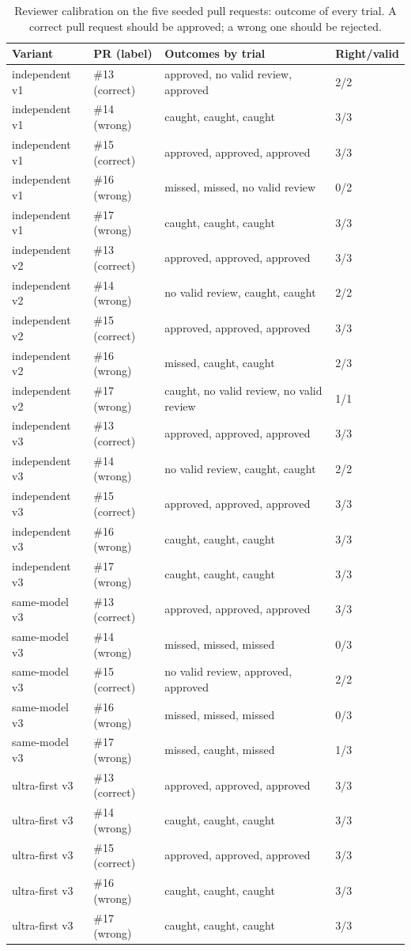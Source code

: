 \begin{table}[ht]\centering\small
\caption{Reviewer calibration on the five seeded pull requests: outcome of every trial. A correct pull request should be approved; a wrong one should be rejected.}\label{tab:seeded}
\begin{tabular}{@{}l l l l@{}}
\toprule
Variant & PR (label) & Outcomes by trial & Right/valid \\ \midrule
independent v1 & \#13 (correct) & approved, no valid review, approved & 2/2 \\
independent v1 & \#14 (wrong) & caught, caught, caught & 3/3 \\
independent v1 & \#15 (correct) & approved, approved, approved & 3/3 \\
independent v1 & \#16 (wrong) & missed, missed, no valid review & 0/2 \\
independent v1 & \#17 (wrong) & caught, caught, caught & 3/3 \\
independent v2 & \#13 (correct) & approved, approved, approved & 3/3 \\
independent v2 & \#14 (wrong) & no valid review, caught, caught & 2/2 \\
independent v2 & \#15 (correct) & approved, approved, approved & 3/3 \\
independent v2 & \#16 (wrong) & missed, caught, caught & 2/3 \\
independent v2 & \#17 (wrong) & caught, no valid review, no valid review & 1/1 \\
independent v3 & \#13 (correct) & approved, approved, approved & 3/3 \\
independent v3 & \#14 (wrong) & no valid review, caught, caught & 2/2 \\
independent v3 & \#15 (correct) & approved, approved, approved & 3/3 \\
independent v3 & \#16 (wrong) & caught, caught, caught & 3/3 \\
independent v3 & \#17 (wrong) & caught, caught, caught & 3/3 \\
same-model v3 & \#13 (correct) & approved, approved, approved & 3/3 \\
same-model v3 & \#14 (wrong) & missed, missed, missed & 0/3 \\
same-model v3 & \#15 (correct) & no valid review, approved, approved & 2/2 \\
same-model v3 & \#16 (wrong) & missed, missed, missed & 0/3 \\
same-model v3 & \#17 (wrong) & missed, caught, missed & 1/3 \\
ultra-first v3 & \#13 (correct) & approved, approved, approved & 3/3 \\
ultra-first v3 & \#14 (wrong) & caught, caught, caught & 3/3 \\
ultra-first v3 & \#15 (correct) & approved, approved, approved & 3/3 \\
ultra-first v3 & \#16 (wrong) & caught, caught, caught & 3/3 \\
ultra-first v3 & \#17 (wrong) & caught, caught, caught & 3/3 \\
\bottomrule\end{tabular}
\end{table}
